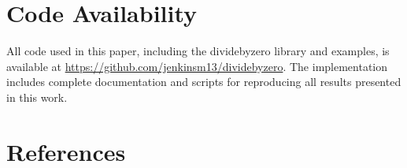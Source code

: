 \documentclass[12pt]{article}
\begin{document}
\section{Code Availability}
All code used in this paper, including the dividebyzero library and examples, is available at \url{https://github.com/jenkinsm13/dividebyzero}. The implementation includes complete documentation and scripts for reproducing all results presented in this work.

\section{References}


\end{document}
